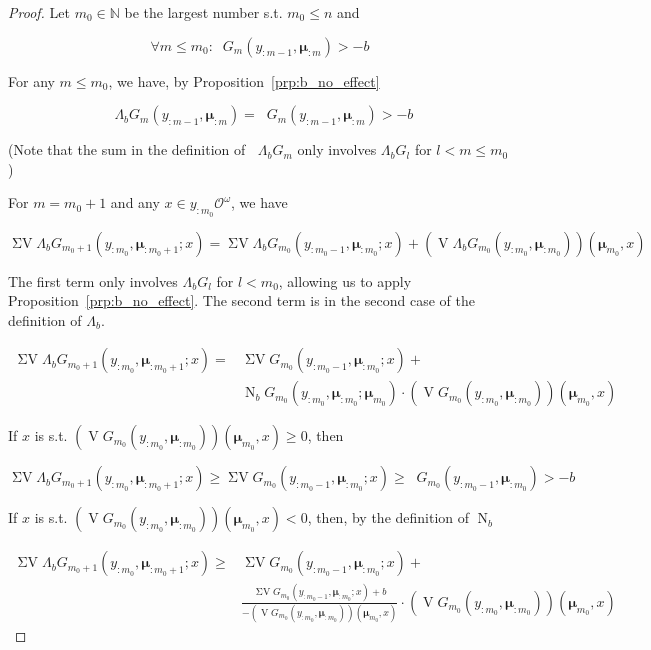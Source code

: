 \documentclass[aop,preprint]{imsart}
\numberwithin{equation}{section}
\theoremstyle{definition}
\theoremstyle{plain}
\newcommand{\Nats}{\mathbb{N}}
\newcommand{\Ob}{\mathcal{O}}
\newcommand{\OO}{\Ob^\omega}
\DeclareMathOperator{\V}{V}
\DeclareMathOperator{\SV}{\Sigma V}
\DeclareMathOperator{\SVM}{\Sigma V_{\min}}
\DeclareMathOperator{\Nr}{N}
\newcommand{\Bd}{\Lambda}
\newcommand{\BM}{\bm{\mu}}
\begin{document}
\begin{proof}

Let ${m_0 \in \Nats}$ be the largest number s.t. ${m_0 \leq n}$ and 

$$\forall m \leq m_0: \SVM G_m\left(y_{:m-1},\BM_{:m}\right) > -b$$

For any ${m \leq m_0}$, we have, by Proposition~\ref{prp:b_no_effect}

$$\SVM \Bd_b G_m\left(y_{:m-1},\BM_{:m}\right)=\SVM G_m\left(y_{:m-1},\BM_{:m}\right) > -b$$

(Note that the sum in the definition of ${\SVM \Bd_b G_m}$ only involves ${\Bd_b G_l}$ for ${l < m \leq m_0}$)

For ${m=m_0+1}$ and any $x \in y_{:m_0}\OO$, we have

$$\SV \Bd_b G_{m_0+1}\left(y_{:m_0},\BM_{:m_0+1};x\right) = \SV \Bd_b G_{m_0}\left(y_{:m_0-1},\BM_{:m_0};x\right) + \left(\V \Bd_b G_{m_0}\left(y_{:m_0},\BM_{:m_0}\right)\right)\left(\BM_{m_0},x\right)$$

The first term only involves ${\Bd_b G_l}$ for ${l < m_0}$, allowing us to apply Proposition~\ref{prp:b_no_effect}. The second term is in the second case of the definition of $\Bd_b$.

\begin{align*}
\SV \Bd_b G_{m_0+1}\left(y_{:m_0},\BM_{:m_0+1};x\right) = &\SV G_{m_0}\left(y_{:m_0-1},\BM_{:m_0};x\right) +\\ &\Nr_b G_{m_0}\left(y_{:m_0},\BM_{:m_0};\BM_{m_0}\right) \cdot \left(\V G_{m_0}\left(y_{:m_0},\BM_{:m_0}\right)\right)\left(\BM_{m_0},x\right)
\end{align*}

If ${x}$ is s.t. ${\left(\V G_{m_0}\left(y_{:m_0},\BM_{:m_0}\right)\right)\left(\BM_{m_0},x\right) \geq 0}$, then

\[\SV \Bd_b G_{m_0+1}\left(y_{:m_0},\BM_{:m_0+1};x\right) \geq \SV G_{m_0}\left(y_{:m_0-1},\BM_{:m_0};x\right)\geq \SVM G_{m_0}\left(y_{:m_0-1},\BM_{:m_0}\right) > -b\]

If ${x}$ is s.t. ${\left(\V G_{m_0}\left(y_{:m_0},\BM_{:m_0}\right)\right)\left(\BM_{m_0},x\right) < 0}$, then, by the definition of $\Nr_b$

\begin{align*}
\SV \Bd_b G_{m_0+1}\left(y_{:m_0},\BM_{:m_0+1};x\right) \geq &\SV G_{m_0}\left(y_{:m_0-1},\BM_{:m_0};x\right)+ \\
&\frac{\SV G_{m_0}\left(y_{:m_0-1},\BM_{:m_0};x\right) + b}{-\left(\V G_{m_0}\left(y_{:m_0},\BM_{:m_0}\right)\right)\left(\BM_{m_0},x\right)} \cdot \left(\V G_{m_0}\left(y_{:m_0},\BM_{:m_0}\right)\right)\left(\BM_{m_0},x\right)
\end{align*}


\end{proof}
\end{document}

